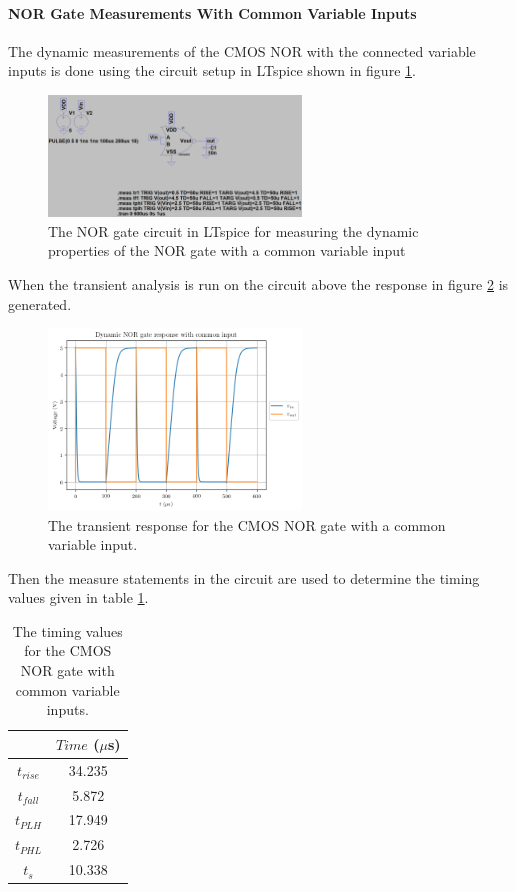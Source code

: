 \documentclass[titlepage, 12pt]{article}
\begin{document}
    \paragraph{NOR Gate Measurements With Common Variable Inputs}

    The dynamic measurements of the CMOS NOR with the connected
    variable inputs is done using the circuit setup in LTspice shown
    in figure \ref{fig:part_22_NOR_AB_circuit}.
    \begin{figure}[H]
        \centering
        \includegraphics[width=0.6\textwidth]
        {figures/part_22_NOR_AB_circuit.png}
        \caption{The NOR gate circuit in LTspice for measuring the
            dynamic properties of the NOR gate with a common variable
        input}
        \label{fig:part_22_NOR_AB_circuit}
    \end{figure}
    When the transient analysis is run on the circuit above the response
    in figure \ref{fig:part_22_NOR_AB} is generated.
    \begin{figure}[H]
        \centering
        \includegraphics[width=0.6\textwidth]{figures/part_22_NOR_AB.png}
        \caption{The transient response for the CMOS NOR gate with a
        common variable input.}
        \label{fig:part_22_NOR_AB}
    \end{figure}
    Then the measure statements in the circuit are used to determine the
    timing values given in table \ref{tab:NOR_AB_time}.
    \begin{table}[H]
        \centering
        \caption{The timing values for the CMOS NOR gate with common
        variable inputs.}
        \label{tab:NOR_AB_time}
        \begin{tabular}{c|c}
            & $Time$ ($\mu$s)\\
            \hline
            $t_{rise}$ & 34.235\\
            $t_{fall}$ & 5.872\\
            $t_{PLH}$ & 17.949\\
            $t_{PHL}$ & 2.726\\
            $t_s$ & 10.338\\
        \end{tabular}
    \end{table}
\end{document}

